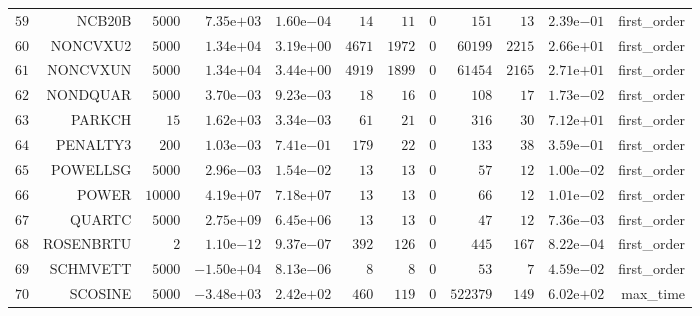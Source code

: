 \begin{longtable}{rrrrrrrrrrrr}
  \(    59\) & NCB20B & \(  5000\) & \( 7.35\)e\(+03\) & \( 1.60\)e\(-04\) & \(    14\) & \(    11\) & \(     0\) & \(   151\) & \(    13\) & \( 2.39\)e\(-01\) & first\_order \\
  \(    60\) & NONCVXU2 & \(  5000\) & \( 1.34\)e\(+04\) & \( 3.19\)e\(+00\) & \(  4671\) & \(  1972\) & \(     0\) & \( 60199\) & \(  2215\) & \( 2.66\)e\(+01\) & first\_order \\
  \(    61\) & NONCVXUN & \(  5000\) & \( 1.34\)e\(+04\) & \( 3.44\)e\(+00\) & \(  4919\) & \(  1899\) & \(     0\) & \( 61454\) & \(  2165\) & \( 2.71\)e\(+01\) & first\_order \\
  \(    62\) & NONDQUAR & \(  5000\) & \( 3.70\)e\(-03\) & \( 9.23\)e\(-03\) & \(    18\) & \(    16\) & \(     0\) & \(   108\) & \(    17\) & \( 1.73\)e\(-02\) & first\_order \\
  \(    63\) & PARKCH & \(    15\) & \( 1.62\)e\(+03\) & \( 3.34\)e\(-03\) & \(    61\) & \(    21\) & \(     0\) & \(   316\) & \(    30\) & \( 7.12\)e\(+01\) & first\_order \\
  \(    64\) & PENALTY3 & \(   200\) & \( 1.03\)e\(-03\) & \( 7.41\)e\(-01\) & \(   179\) & \(    22\) & \(     0\) & \(   133\) & \(    38\) & \( 3.59\)e\(-01\) & first\_order \\
  \(    65\) & POWELLSG & \(  5000\) & \( 2.96\)e\(-03\) & \( 1.54\)e\(-02\) & \(    13\) & \(    13\) & \(     0\) & \(    57\) & \(    12\) & \( 1.00\)e\(-02\) & first\_order \\
  \(    66\) & POWER & \( 10000\) & \( 4.19\)e\(+07\) & \( 7.18\)e\(+07\) & \(    13\) & \(    13\) & \(     0\) & \(    66\) & \(    12\) & \( 1.01\)e\(-02\) & first\_order \\
  \(    67\) & QUARTC & \(  5000\) & \( 2.75\)e\(+09\) & \( 6.45\)e\(+06\) & \(    13\) & \(    13\) & \(     0\) & \(    47\) & \(    12\) & \( 7.36\)e\(-03\) & first\_order \\
  \(    68\) & ROSENBRTU & \(     2\) & \( 1.10\)e\(-12\) & \( 9.37\)e\(-07\) & \(   392\) & \(   126\) & \(     0\) & \(   445\) & \(   167\) & \( 8.22\)e\(-04\) & first\_order \\
  \(    69\) & SCHMVETT & \(  5000\) & \(-1.50\)e\(+04\) & \( 8.13\)e\(-06\) & \(     8\) & \(     8\) & \(     0\) & \(    53\) & \(     7\) & \( 4.59\)e\(-02\) & first\_order \\
  \(    70\) & SCOSINE & \(  5000\) & \(-3.48\)e\(+03\) & \( 2.42\)e\(+02\) & \(   460\) & \(   119\) & \(     0\) & \(522379\) & \(   149\) & \( 6.02\)e\(+02\) & max\_time \\

\end{longtable}
